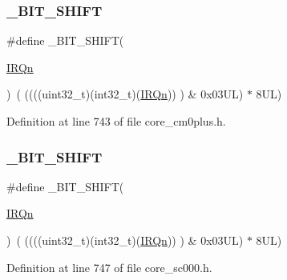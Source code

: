 \subsubsection{\texorpdfstring{\+\_\+\+B\+I\+T\+\_\+\+S\+H\+I\+FT}{\_BIT\_SHIFT}\hspace{0.1cm}{\footnotesize\ttfamily [2/3]}}
{\footnotesize\ttfamily \#define \+\_\+\+B\+I\+T\+\_\+\+S\+H\+I\+FT(\begin{DoxyParamCaption}\item[{}]{\hyperlink{group___configuration__section__for___c_m_s_i_s_ga666eb0caeb12ec0e281415592ae89083}{I\+R\+Qn} }\end{DoxyParamCaption})~(  ((((uint32\+\_\+t)(int32\+\_\+t)(\hyperlink{group___configuration__section__for___c_m_s_i_s_ga666eb0caeb12ec0e281415592ae89083}{I\+R\+Qn}))         )      \&  0x03\+U\+L) $\ast$ 8\+U\+L)}



Definition at line 743 of file core\+\_\+cm0plus.\+h.

\mbox{\label{group___c_m_s_i_s___core___n_v_i_c_functions_ga53c75b28823441c6153269f0ecbed878}} 
\subsubsection{\texorpdfstring{\+\_\+\+B\+I\+T\+\_\+\+S\+H\+I\+FT}{\_BIT\_SHIFT}\hspace{0.1cm}{\footnotesize\ttfamily [3/3]}}
{\footnotesize\ttfamily \#define \+\_\+\+B\+I\+T\+\_\+\+S\+H\+I\+FT(\begin{DoxyParamCaption}\item[{}]{\hyperlink{group___configuration__section__for___c_m_s_i_s_ga666eb0caeb12ec0e281415592ae89083}{I\+R\+Qn} }\end{DoxyParamCaption})~(  ((((uint32\+\_\+t)(int32\+\_\+t)(\hyperlink{group___configuration__section__for___c_m_s_i_s_ga666eb0caeb12ec0e281415592ae89083}{I\+R\+Qn}))         )      \&  0x03\+U\+L) $\ast$ 8\+U\+L)}



Definition at line 747 of file core\+\_\+sc000.\+h.

\mbox{\label{group___c_m_s_i_s___core___n_v_i_c_functions_ga370ec4b1751a6a889d849747df3763a9}} 

